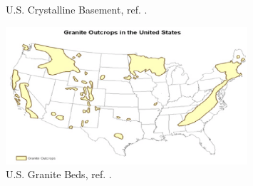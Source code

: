 \begin{frame}[ctb!]
\begin{minipage}{0.44\textwidth}
\begin{figure}[h!]
         \caption{U.S. Crystalline Basement, ref.  \cite{newscientist_where_2011}.}
     \end{figure}
     \begin{figure}[h!]
         \includegraphics[width=0.8\textwidth]{./images/graniteBush.eps}
         \caption{U.S. Granite Beds, ref. \cite{bush_economic_1976}.}
     \end{figure}
   \end{minipage}
\end{frame}
